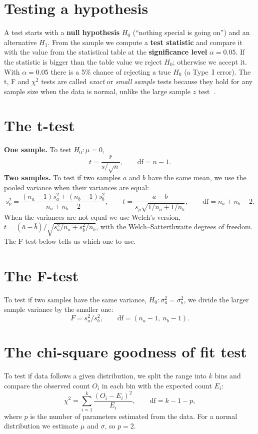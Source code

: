 \documentclass[10pt,a4paper,openany,oneside]{book}
\begin{document}
\section{Testing a hypothesis}
A test starts with a \textbf{null hypothesis} $H_0$ (``nothing special is going on'') and an
alternative $H_1$. From the sample we compute a \textbf{test statistic} and compare it with
the value from the statistical table at the \textbf{significance level} $\alpha = 0.05$. If
the statistic is bigger than the table value we reject $H_0$; otherwise we accept it. With
$\alpha=0.05$ there is a 5\% chance of rejecting a true $H_0$ (a Type~I error). The t, F
and $\chi^2$ tests are called \emph{exact} or \emph{small sample} tests because they hold
for any sample size when the data is normal, unlike the large sample $z$ test~\cite{gupta}.

\section{The t-test}
\textbf{One sample.} To test $H_0: \mu = 0$,
\begin{equation}
  t = \frac{\bar r}{s/\sqrt n}, \qquad \text{df} = n-1 .
\end{equation}
\textbf{Two samples.} To test if two samples $a$ and $b$ have the same mean, we use the
pooled variance when their variances are equal:
\begin{equation}
  s_p^2 = \frac{(n_a-1)s_a^2 + (n_b-1)s_b^2}{n_a+n_b-2},\qquad
  t = \frac{\bar a - \bar b}{s_p\sqrt{1/n_a + 1/n_b}},\qquad \text{df}=n_a+n_b-2 .
\end{equation}
When the variances are not equal we use Welch's version,
$t = (\bar a - \bar b)/\sqrt{s_a^2/n_a + s_b^2/n_b}$, with the Welch--Satterthwaite degrees
of freedom. The F-test below tells us which one to use.

\section{The F-test}
To test if two samples have the same variance, $H_0: \sigma_a^2 = \sigma_b^2$, we divide the
larger sample variance by the smaller one:
\begin{equation}
  F = s_a^2 / s_b^2, \qquad \text{df} = (n_a-1,\ n_b-1).
\end{equation}

\section{The chi-square goodness of fit test}
To test if data follows a given distribution, we split the range into $k$ bins and compare
the observed count $O_i$ in each bin with the expected count $E_i$:
\begin{equation}
  \chi^2 = \sum_{i=1}^{k} \frac{(O_i - E_i)^2}{E_i}, \qquad \text{df} = k - 1 - p ,
\end{equation}
where $p$ is the number of parameters estimated from the data. For a normal distribution we
estimate $\mu$ and $\sigma$, so $p=2$.
\end{document}
